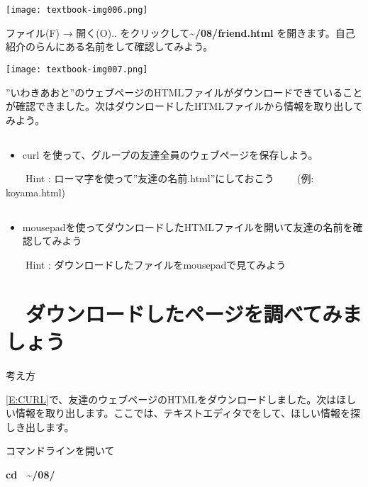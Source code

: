 \begin{center}
  \texttt{[image: textbook-img006.png]}
\end{center}
ファイル(F) → 開く(O).. をクリックして\textbf{{\textasciitilde}/08/friend.html} を開きます。自己紹介のらんにある名前をして確認してみよう。

\begin{center}
  \texttt{[image: textbook-img007.png]}
\end{center}

”いわきあおと”のウェブページのHTMLファイルがダウンロードできていることが確認できました。次はダウンロードしたHTMLファイルから情報を取り出してみよう。

\clearpage
\subsection*{\theQuestion\label{Q:CURL}}
\begin{itemize}
  \item curl を使って、グループの友達全員のウェブページを保存しよう。
\end{itemize}
\ \ \ \ Hint : ローマ字を使って”友達の名前.html”にしておこう
\ \ \ \ (例: koyama.html)

\subsection*{\theQuestion\label{Q:HTML}}
\begin{itemize}
  \item mousepadを使ってダウンロードしたHTMLファイルを開いて友達の名前を確認してみよう
\end{itemize}
\ \ \ \ Hint : ダウンロードしたファイルをmousepadで見てみよう


\clearpage
\section{\theExercise　ダウンロードしたページを調べてみましょう}
\addtocounter{Exercise}{-1}\label{E:HTML}
\noindent 考え方

\ref*{E:CURL}で、友達のウェブページのHTMLをダウンロードしました。次はほしい情報を取り出します。ここでは、テキストエディタでをして、ほしい情報を探しき出します。

コマンドラインを開いて

\textbf{cd \ {\textasciitilde}/08/}

